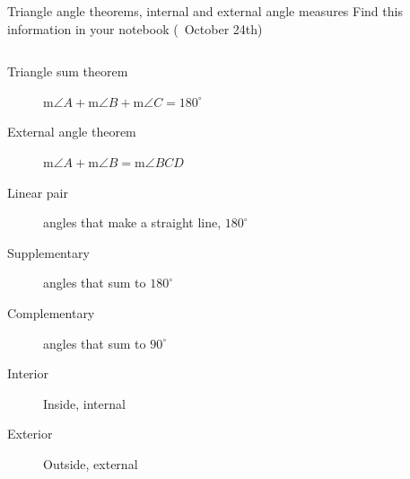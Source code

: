 \begin{frame}{Triangle angle theorems, internal and external angle measures}
  {Find this information in your notebook (~October 24th)}
  \begin{columns}
      \begin{description}
        \item[Triangle sum theorem] m$\angle A + \text{m}\angle B + \text{m}\angle C = 180^\circ$
        \item[External angle theorem] m$\angle A + \text{m}\angle B = \text{m}\angle BCD$
        \item[Linear pair] angles that make a straight line, $180^\circ$
        \item[Supplementary] angles that sum to $180^\circ$
        \item[Complementary] angles that sum to $90^\circ$
        \item[Interior] Inside, internal
        \item[Exterior] Outside, external
      \end{description}
    \begin{flushright}
    \end{flushright}
  \end{columns}
\end{frame}

